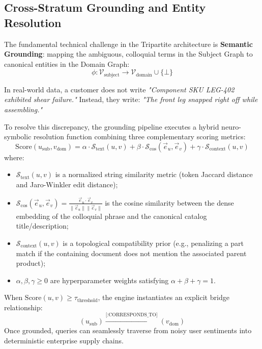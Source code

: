\documentclass[10pt,twocolumn,letterpaper]{article}
\begin{document}
\subsection{Cross-Stratum Grounding and Entity Resolution}
The fundamental technical challenge in the Tripartite architecture is \textbf{Semantic Grounding}: mapping the ambiguous, colloquial terms in the Subject Graph to canonical entities in the Domain Graph:
\begin{equation}
\phi: \mathcal{V}_{\text{subject}} \longrightarrow \mathcal{V}_{\text{domain}} \cup \{\bot\}
\end{equation}

In real-world data, a customer does not write \textit{"Component SKU LEG-402 exhibited shear failure."} Instead, they write: \textit{"The front leg snapped right off while assembling."}

To resolve this discrepancy, the grounding pipeline executes a hybrid neuro-symbolic resolution function combining three complementary scoring metrics:
\begin{equation}
\text{Score}(u_{\text{sub}}, v_{\text{dom}}) = \alpha \cdot \mathcal{S}_{\text{text}}(u, v) + \beta \cdot \mathcal{S}_{\text{cos}}(\vec{e}_u, \vec{e}_v) + \gamma \cdot \mathcal{S}_{\text{context}}(u, v)
\end{equation}
where:
\begin{itemize}
    \item $\mathcal{S}_{\text{text}}(u, v)$ is a normalized string similarity metric (token Jaccard distance and Jaro-Winkler edit distance);
    \item $\mathcal{S}_{\text{cos}}(\vec{e}_u, \vec{e}_v) = \frac{\vec{e}_u \cdot \vec{e}_v}{\|\vec{e}_u\| \|\vec{e}_v\|}$ is the cosine similarity between the dense embedding of the colloquial phrase and the canonical catalog title/description;
    \item $\mathcal{S}_{\text{context}}(u, v)$ is a topological compatibility prior (e.g., penalizing a part match if the containing document does not mention the associated parent product);
    \item $\alpha, \beta, \gamma \ge 0$ are hyperparameter weights satisfying $\alpha + \beta + \gamma = 1$.
\end{itemize}

When $\text{Score}(u, v) \ge \tau_{\text{threshold}}$, the engine instantiates an explicit bridge relationship:
\begin{equation}
(u_{\text{sub}})\xrightarrow{\text{[:CORRESPONDS\_TO]}} (v_{\text{dom}})
\end{equation}
Once grounded, queries can seamlessly traverse from noisy user sentiments into deterministic enterprise supply chains.
\end{document}
